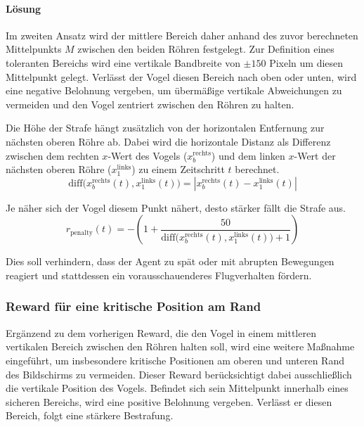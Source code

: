 \documentclass[conference]{IEEEtran}
\begin{document}
\paragraph{Lösung}
Im zweiten Ansatz wird der mittlere Bereich daher anhand des zuvor berechneten Mittelpunkts \( M \) zwischen den beiden Röhren festgelegt. Zur Definition eines toleranten Bereichs wird eine vertikale Bandbreite von \(\pm150\) Pixeln um diesen Mittelpunkt gelegt. Verlässt der Vogel diesen Bereich nach oben oder unten, wird eine negative Belohnung vergeben, um übermäßige vertikale Abweichungen zu vermeiden und den Vogel zentriert zwischen den Röhren zu halten.

Die Höhe der Strafe hängt zusätzlich von der horizontalen Entfernung zur nächsten oberen Röhre ab. Dabei wird die horizontale Distanz als Differenz zwischen dem rechten \(x\)-Wert des Vogels (\(x_b^{\text{rechts}}\)) und dem linken \(x\)-Wert der nächsten oberen Röhre (\(x_1^{\text{links}}\)) zu einem Zeitschritt \(t\) berechnet.
\begin{equation}
	\mathrm{diff}\bigl(x_b^{\text{rechts}}(t), x_1^{\text{links}}(t)\bigr) = \left| x_b^{\text{rechts}}(t) - x_1^{\text{links}}(t) \right|
\end{equation}

Je näher sich der Vogel diesem Punkt nähert, desto stärker fällt die Strafe aus. 
\begin{equation}
	r_{\text{penalty}}(t) = -\left(1 + \frac{50}{\mathrm{diff}\bigl(x_b^{\text{rechts}}(t), x_1^{\text{links}}(t)\bigr) + 1}\right)
\end{equation}

Dies soll verhindern, dass der Agent zu spät oder mit abrupten Bewegungen reagiert und stattdessen ein vorausschauenderes Flugverhalten fördern.\\

\subsubsection{Reward für eine kritische Position am Rand}\label{reward_shaping_four}
Ergänzend zu dem vorherigen Reward, die den Vogel in einem mittleren vertikalen Bereich zwischen den Röhren halten soll, wird eine weitere Maßnahme eingeführt, um insbesondere kritische Positionen am oberen und unteren Rand des Bildschirms zu vermeiden. Dieser Reward berücksichtigt dabei ausschließlich die vertikale Position des Vogels. Befindet sich sein Mittelpunkt innerhalb eines sicheren Bereichs, wird eine positive Belohnung vergeben. Verlässt er diesen Bereich, folgt eine stärkere Bestrafung. 
\end{document}
